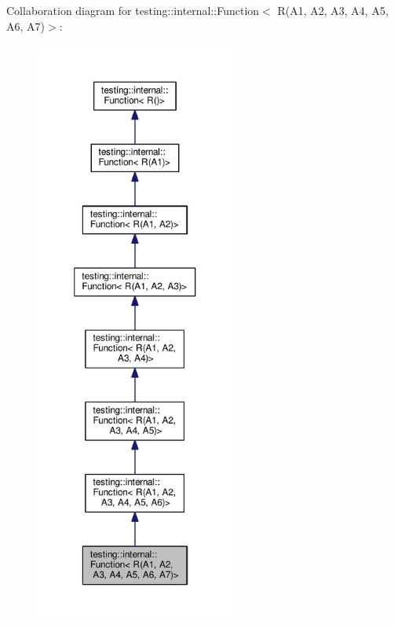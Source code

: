 Collaboration diagram for testing\+:\+:internal\+:\+:Function$<$ R(A1, A2, A3, A4, A5, A6, A7)$>$\+:\nopagebreak
\begin{figure}[H]
\begin{center}
\leavevmode
\includegraphics[height=550pt]{structtesting_1_1internal_1_1Function_3_01R_07A1_00_01A2_00_01A3_00_01A4_00_01A5_00_01A6_00_01A7_08_4__coll__graph}
\end{center}
\end{figure}
